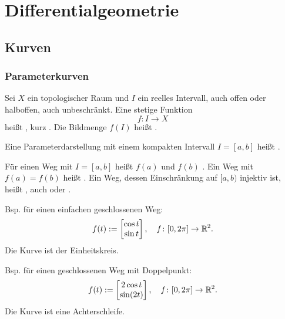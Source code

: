 
\chapter{Differentialgeometrie}
\section{Kurven}
\subsection{Parameterkurven}

\begin{definition}
Sei $X$ ein topologischer Raum und
$I$ ein reelles Intervall, auch offen oder halboffen, auch unbeschränkt.
Eine stetige Funktion%
\begin{equation}\label{eq:Parameterkurve}
f\colon I\to X
\end{equation}
heißt , kurz
. Die Bildmenge $f(I)$ heißt .

Eine Parameterdarstellung mit einem kompakten Intervall $I=[a,b]$
heißt .

Für einen Weg mit $I=[a,b]$ heißt $f(a)$ 
und $f(b)$ . Ein Weg mit $f(a)=f(b)$
heißt . Ein Weg, dessen Einschränkung auf $[a,b)$
injektiv ist, heißt , auch  oder
.
\end{definition}


Bsp. für einen einfachen geschlossenen Weg:
\begin{equation}
f(t):=\begin{bmatrix}
\cos t\\
\sin t
\end{bmatrix},\quad
f\colon [0,2\pi]\to \mathbb R^2.
\end{equation}
Die Kurve ist der Einheitskreis.

Bsp. für einen geschlossenen Weg mit Doppelpunkt:
\begin{equation}
f(t):=\begin{bmatrix}
2\cos t\\
\sin(2t)
\end{bmatrix},\quad
f\colon [0,2\pi]\to \mathbb R^2.
\end{equation}
Die Kurve ist eine Achterschleife.

